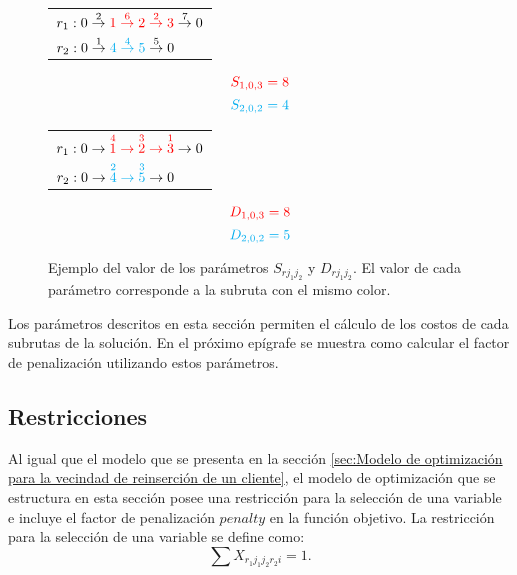 \documentclass[12pt]{report}
\begin{document}
	\begin{figure}[!h]
		\centering
		\begin{minipage}{0.45\textwidth}
			\begin{tabular}{l}
				$r_1: 0 \overset{2}{\rightarrow} \textcolor{red}{1 \overset{6}{\rightarrow} 2 \overset{2}{\rightarrow} 3} \overset{7}{\rightarrow} 0$\\
				$r_2: 0\overset{1}{\rightarrow} \textcolor{cyan}{4 \overset{4}{\rightarrow} 5} \overset{5}{\rightarrow} 0$
			\end{tabular}
		\end{minipage}
		\hfill
		\begin{minipage}{0.45\textwidth}
			\[ \textcolor{red}{S_{1,0,3} = 8} \]
			\[ \textcolor{cyan}{S_{2,0,2} = 4} \]
		\end{minipage}
		\vspace{0.5cm}
		\vfill
		\begin{minipage}{0.45\textwidth}
			\begin{tabular}{l}
				$r_1: 0 \rightarrow\textcolor{red}{\overset{4}{1} \rightarrow \overset{3}{2} \rightarrow \overset{1}{3}} \rightarrow 0$\\
				$r_2: 0 \rightarrow \textcolor{cyan}{\overset{2}{4} \rightarrow \overset{3}{5}} \rightarrow 0$
			\end{tabular}
		\end{minipage}
		\hfill
		\begin{minipage}{0.45\textwidth}
			\[ \textcolor{red}{D_{1,0,3} = 8} \]
			\[ \textcolor{cyan}{D_{2,0,2} = 5} \]
		\end{minipage}


		\caption {Ejemplo del valor de los parámetros $S_{rj_1j_2}$ y $D_{rj_1j_2}$. El valor de cada parámetro corresponde a la subruta con el mismo color.}
		\label{fig:Valor de parametros}
	\end{figure}

	Los parámetros descritos en esta sección permiten el cálculo de los costos de cada subrutas de la solución. En el próximo epígrafe se muestra como calcular el factor de penalización utilizando estos parámetros.

	\subsection{Restricciones}
	Al igual que el modelo que se presenta en la sección \ref{sec:Modelo de optimización para la vecindad de reinserción de un cliente}, el modelo de optimización que se estructura en esta sección posee una restricción para la selección de una variable e incluye el factor de penalización $penalty$ en la función objetivo. La restricción para la selección de una variable se define como:
	\[
	\sum  X_{r_1j_1j_2r_2i} = 1.
	\]
\end{document}

